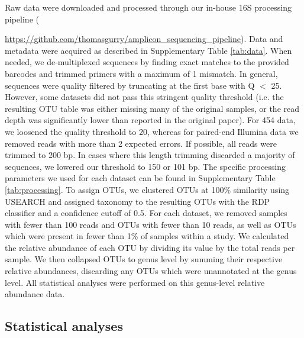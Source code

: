 Raw data were downloaded and processed through our in-house 16S processing pipeline ({\url{ https://github.com/thomasgurry/amplicon_sequencing_pipeline}).
Data and metadata were acquired as described in Supplementary Table \ref{tab:data}.
When needed, we de-multiplexed sequences by finding exact matches to the provided barcodes and trimmed primers with a maximum of 1 mismatch.
In general, sequences were quality filtered by truncating at the first base with Q $<$ 25.
However, some datasets did not pass this stringent quality threshold (i.e. the resulting OTU table was either missing many of the original samples, or the read depth was significantly lower than reported in the original paper).
For 454 data, we loosened the quality threshold to 20, whereas for paired-end Illumina data we removed reads with more than 2 expected errors.
If possible, all reads were trimmed to 200 bp.
In cases where this length trimming discarded a majority of sequences, we lowered our threshold to 150 or 101 bp.
The specific processing parameters we used for each dataset can be found in Supplementary Table \ref{tab:processing}.
To assign OTUs, we clustered OTUs at 100\% similarity using USEARCH \cite{edgar-usearch-2010} and assigned taxonomy to the resulting OTUs with the RDP classifier \cite{wang2007naive} and a confidence cutoff of 0.5.
For each dataset, we removed samples with fewer than 100 reads and OTUs with fewer than 10 reads, as well as OTUs which were present in fewer than 1\% of samples within a study.
We calculated the relative abundance of each OTU by dividing its value by the total reads per sample.
We then collapsed OTUs to genus level by summing their respective relative abundances, discarding any OTUs which were unannotated at the genus level.
All statistical analyses were performed on this genus-level relative abundance data.

\subsection{Statistical analyses}

}
